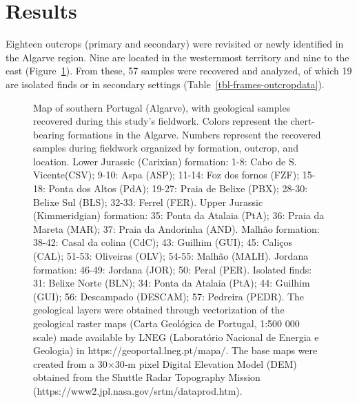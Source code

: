 \documentclass[
  a4paper,
  DIV=11,
  numbers=noendperiod]{scrreprt}
\begin{document}
\section{Results}\label{results}

Eighteen outcrops (primary and secondary) were revisited or newly
identified in the Algarve region. Nine are located in the westernmost
territory and nine to the east (Figure~\ref{fig-frames-sourcesmap}).
From these, 57 samples were recovered and analyzed, of which 19 are
isolated finds or in secondary settings
(Table~\ref{tbl-frames-outcropdata}).

\begin{figure}


\caption{\label{fig-frames-sourcesmap}Map of southern Portugal
(Algarve), with geological samples recovered during this study's
fieldwork. Colors represent the chert-bearing formations in the Algarve.
Numbers represent the recovered samples during fieldwork organized by
formation, outcrop, and location. Lower Jurassic (Carixian) formation:
1-8: Cabo de S. Vicente(CSV); 9-10: Aspa (ASP); 11-14: Foz dos fornos
(FZF); 15-18: Ponta dos Altos (PdA); 19-27: Praia de Belixe (PBX);
28-30: Belixe Sul (BLS); 32-33: Ferrel (FER). Upper Jurassic
(Kimmeridgian) formation: 35: Ponta da Atalaia (PtA); 36: Praia da
Mareta (MAR); 37: Praia da Andorinha (AND). Malhão formation: 38-42:
Casal da colina (CdC); 43: Guilhim (GUI); 45: Caliços (CAL); 51-53:
Oliveiras (OLV); 54-55: Malhão (MALH). Jordana formation: 46-49: Jordana
(JOR); 50: Peral (PER). Isolated finds: 31: Belixe Norte (BLN); 34:
Ponta da Atalaia (PtA); 44: Guilhim (GUI); 56: Descampado (DESCAM); 57:
Pedreira (PEDR). The geological layers were obtained through
vectorization of the geological raster maps (Carta Geológica de
Portugal, 1:500 000 scale) made available by LNEG (Laboratório Nacional
de Energia e Geologia) in https://geoportal.lneg.pt/mapa/. The base maps
were created from a 30×30‐m pixel Digital Elevation Model (DEM) obtained
from the Shuttle Radar Topography Mission
(https://www2.jpl.nasa.gov/srtm/dataprod.htm).}

\end{figure}%
\end{document}
